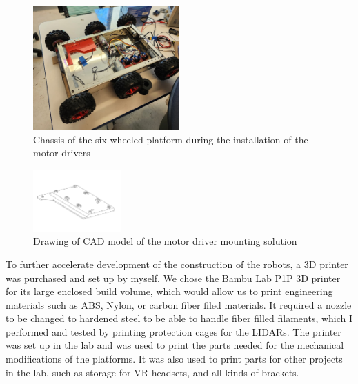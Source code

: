 \documentclass[12pt]{article}
\begin{document}
        \begin{figure}[H]
            \centering
            \includegraphics[width=0.5\textwidth]{Images/wheeled_platform_empty.jpg}
            \caption{Chassis of the six-wheeled platform during the installation of the motor drivers}
            \label{fig:wheeled_latform}
        \end{figure}


        \begin{figure}[H]
            \centering
            \includegraphics[width=0.3\textwidth]{Images/Motor_driver_holder.pdf}
            \caption{Drawing of CAD model of the motor driver mounting solution}
            \label{fig:motor_driver_mount}
        \end{figure}
        
        To further accelerate development of the construction of the robots, a 3D printer was purchased and set up by myself. We chose the Bambu Lab P1P 3D printer for its large enclosed build volume, which would allow us to print engineering materials such as ABS, Nylon, or carbon fiber filed materials. It required a nozzle to be changed to hardened steel to be able to handle fiber filled filaments, which I performed and tested by printing protection cages for the LIDARs. The printer was set up in the lab and was used to print the parts needed for the mechanical modifications of the platforms. It was also used to print parts for other projects in the lab, such as storage for VR headsets, and all kinds of brackets.
\end{document}
